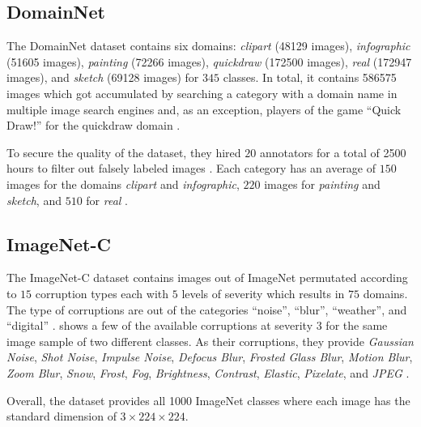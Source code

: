 \subsection{DomainNet}

The DomainNet dataset \citep{PengBXHSW19} contains six domains: \emph{clipart} (\num{48129} images), \emph{infographic} (\num{51605} images), \emph{painting} (\num{72266} images), \emph{quickdraw} (\num{172500} images), \emph{real} (\num{172947} images), and \emph{sketch} (\num{69128} images) for $345$ classes. In total, it contains \num{586575} images  which got accumulated by searching a category with a domain name in multiple image search engines and, as an exception, players of the game ``Quick Draw!'' for the quickdraw domain \citep{PengBXHSW19}.

To secure the quality of the dataset, they hired $20$ annotators for a total of \num{2500} hours to filter out falsely labeled images \citep{PengBXHSW19}. Each category has an average of $150$ images for the domains \emph{clipart} and \emph{infographic}, $220$ images for \emph{painting} and \emph{sketch}, and $510$ for \emph{real} \citep{PengBXHSW19}.

\subsection{ImageNet-C}
The ImageNet-C dataset \citep{HendrycksD19} contains images out of ImageNet \citep{RussakovskyDSKS15} permutated according to $15$ corruption types each with $5$ levels of severity which results in $75$ domains. The type of corruptions are out of the categories ``noise'', ``blur'', ``weather'', and ``digital'' \citep{HendrycksD19}.  shows a few of the available corruptions at severity $3$ for the same image sample of two different classes. As their corruptions, they provide \emph{Gaussian Noise}, \emph{Shot Noise}, \emph{Impulse Noise}, \emph{Defocus Blur}, \emph{Frosted Glass Blur}, \emph{Motion Blur}, \emph{Zoom Blur}, \emph{Snow}, \emph{Frost}, \emph{Fog}, \emph{Brightness}, \emph{Contrast}, \emph{Elastic}, \emph{Pixelate}, and \emph{JPEG} \citep{HendrycksD19}. 

Overall, the dataset provides all \num{1000} ImageNet classes where each image has the standard dimension of $3 \times 224 \times 224$.









